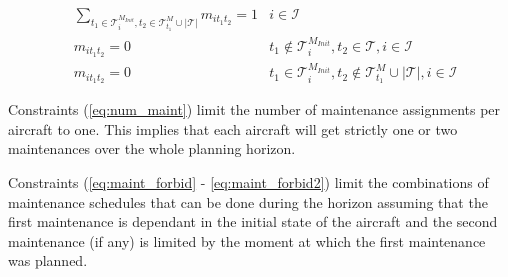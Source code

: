 \documentclass[a4paper,onecolumn,fleqn]{article}
\begin{document}

    \begin{align}
        & \sum_{t_1 \in \mathcal{T}^{M_{Init}}_i, t_2 \in \mathcal{T}^M_{t_1} \cup |\mathcal{T}| } m_{it_1t_2} =  1 
          & i \in \mathcal{I}\label{eq:num_maint} \\
        & m_{it_1t_2} =  0
          & t_1 \notin \mathcal{T}^{M_{Init}}_i, t_2 \in \mathcal{T}, i \in \mathcal{I} \label{eq:maint_forbid} \\
        & m_{it_1t_2} =  0
          & t_1 \in \mathcal{T}^{M_{Init}}_i, t_2 \notin \mathcal{T}^M_{t_1} \cup |\mathcal{T}|, i \in \mathcal{I} \label{eq:maint_forbid2}
    \end{align}

    Constraints (\ref{eq:num_maint}) limit the number of maintenance assignments per aircraft to one. This implies that each aircraft will get strictly one or two maintenances over the whole planning horizon.

    Constraints (\ref{eq:maint_forbid} - \ref{eq:maint_forbid2}) limit the combinations of maintenance schedules that can be done during the horizon assuming that the first maintenance is dependant in the initial state of the aircraft and the second maintenance (if any) is limited by the moment at which the first maintenance was planned.
\end{document}
